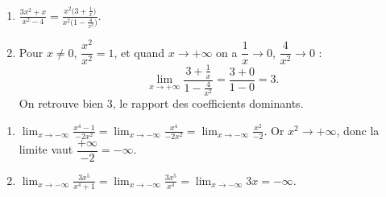 \documentclass[11pt,a4paper]{article}
\begin{document}
\begin{correction}
\begin{enumerate}[label=\alph*),leftmargin=2em,itemsep=3pt]
  \item $\displaystyle\frac{3x^2+x}{x^2-4}=\frac{x^2\bigl(3+\frac1x\bigr)}{x^2\bigl(1-\frac{4}{x^2}\bigr)}$.
  \item Pour $x\neq 0$, $\dfrac{x^2}{x^2}=1$, et quand $x\to+\infty$ on a $\dfrac1x\to 0$, $\dfrac{4}{x^2}\to 0$ :
        \[ \lim_{x\to+\infty}\frac{3+\frac1x}{1-\frac{4}{x^2}}=\frac{3+0}{1-0}=3. \]
        On retrouve bien $3$, le rapport des coefficients dominants.
\end{enumerate}
\end{correction}

\begin{correction}
\begin{enumerate}[label=\alph*),leftmargin=2em,itemsep=3pt]
  \item $\displaystyle\lim_{x\to-\infty}\frac{x^4-1}{-2x^2}=\lim_{x\to-\infty}\frac{x^4}{-2x^2}=\lim_{x\to-\infty}\frac{x^2}{-2}$.
        Or $x^2\to+\infty$, donc la limite vaut $\dfrac{+\infty}{-2}=-\infty$.
  \item $\displaystyle\lim_{x\to-\infty}\frac{3x^5}{x^4+1}=\lim_{x\to-\infty}\frac{3x^5}{x^4}=\lim_{x\to-\infty}3x=-\infty$.
\end{enumerate}
\end{correction}
\end{document}
